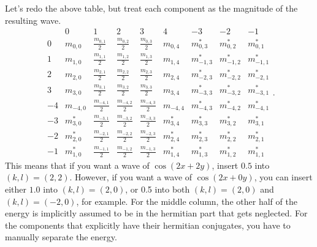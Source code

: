 \documentclass[11pt]{amsart}
\begin{document}
Let's redo the above table, but treat each component as the magnitude of the resulting wave.
\begin{equation}
\begin{array}{c|ccccc|ccc} & 0 & 1 & 2 & 3 & 4 & -3 & -2 & -1 \\ \hline
0 & m_{0,0} & \frac{m_{0,1}}{2} & \frac{m_{0,2}}{2}  & \frac{m_{0,3}}{2}  & m_{0,4}  & m_{0,3}^\ast & m_{0,2}^\ast & m_{0,1}^\ast \\
1 & m_{1,0} & \frac{m_{1,1}}{2} &\frac{ m_{1,2}}{2} & \frac{m_{1,3}}{2} & m_{1,4} & m_{-1,3}^\ast & m_{-1,2}^\ast & m_{-1,1}^\ast \\
2 & m_{2,0} & \frac{m_{2,1}}{2} & \frac{m_{2,2}}{2} & \frac{m_{2,3}}{2} & m_{2,4} & m_{-2,3}^\ast & m_{-2,2}^\ast & m_{-2,1}^\ast \\
3 & m_{3,0} & \frac{m_{3,1}}{2} & \frac{m_{3,2}}{2} & \frac{m_{3,3}}{2} & m_{3,4} & m_{-3,3}^\ast & m_{-3,2}^\ast & m_{-3,1}^\ast \\
-4 & m_{-4,0} & \frac{m_{-4,1}}{2} & \frac{m_{-4,2}}{2} & \frac{m_{-4,3}}{2} & m_{-4,4} & m_{-4,3}^\ast & m_{-4,2}^\ast & m_{-4,1}^\ast \\
-3 & m_{3,0}^\ast & \frac{m_{-3,1}}{2} & \frac{m_{-3,2}}{2} & \frac{m_{-3,3}}{2} & m_{3,4}^\ast & m_{3,3}^\ast & m_{3,2}^\ast & m_{3,1}^\ast \\
-2 & m_{2,0}^\ast & \frac{m_{-2,1}}{2} & \frac{m_{-2,2}}{2} & \frac{m_{-2,3}}{2} & m_{2,4}^\ast & m_{2,3}^\ast & m_{2,2}^\ast & m_{2,1}^\ast \\
-1 & m_{1,0}^\ast & \frac{m_{-1,1}}{2} & \frac{m_{-1,2}}{2} & \frac{m_{-1,3}}{2} & m_{1,4}^\ast & m_{1,3}^\ast & m_{1,2}^\ast & m_{1,1}^\ast\end{array}.
\end{equation}
This means that if you want a wave of $\cos( 2x+2y)$, insert $0.5$ into $(k,l)=(2,2)$. However, if you want a wave of $\cos( 2x+0y)$, you can insert either $1.0$ into $(k,l)=(2,0)$, or 0.5 into both $(k,l)=(2,0)$ and $(k,l)=(-2,0)$, for example. For the middle column, the other half of the energy is implicitly assumed to be in the hermitian part that gets neglected. For the components that explicitly have their hermitian conjugates, you have to manually separate the energy.
\end{document}
